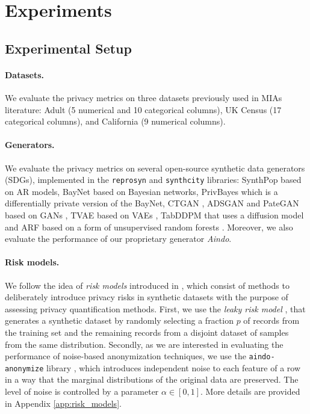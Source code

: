 \section{Experiments}

\subsection{Experimental Setup}

\paragraph{Datasets.}
We evaluate the privacy metrics on three datasets previously used in MIAs literature: Adult \citep{adult} (5 numerical and 10 categorical columns), UK Census \citep{uk_census} (17 categorical columns), and California \citep{california} (9 numerical columns).

\paragraph{Generators.}
We evaluate the privacy metrics on several open-source synthetic data generators (SDGs), implemented in the \texttt{reprosyn} \citep{reprosyn2022} and \texttt{synthcity} \citep{synthcity} libraries: SynthPop \citep{nowok2016synthpop} based on AR models, BayNet \citep{zhang2017privbayes} based on Bayesian networks, PrivBayes \citep{zhang2017privbayes} which is a differentially private version of the BayNet, CTGAN \citep{xu2019modeling}, ADSGAN \citep{yoon2020anonymization} and PateGAN \citep{jordonpate} based on GANs \citep{goodfellow2020generative}, TVAE \citep{xu2019modeling} based on VAEs \citep{Kingma2014}, TabDDPM \citep{kotelnikov2023tabddpm} that uses a diffusion model \citep{ho2020denoising} and ARF \citep{watson2023adversarial} based on a form of unsupervised random forests \citep{ho1995random}.
Moreover, we also evaluate the performance of our proprietary generator \textit{Aindo}.

\paragraph{Risk models.}
We follow the idea of \textit{risk models} introduced in \citet{palacios2025empirical}, which consist of methods to deliberately introduce privacy risks in synthetic datasets with the purpose of assessing privacy quantification methods.
First, we use the \textit{leaky risk model} \citep{palacios2025empirical}, that generates a synthetic dataset by randomly selecting a fraction $p$ of records from the training set and the remaining records from a disjoint dataset of samples from the same distribution.
Secondly, as we are interested in evaluating the performance of noise-based anonymization techniques, we use the \texttt{aindo-anonymize} library \citep{aindo-anonymize}, which introduces independent noise to each feature of a row in a way that the marginal distributions of the original data are preserved. The level of noise is controlled by a parameter $\alpha \in [0,1]$.
More details are provided in Appendix \ref{app:risk_models}.

